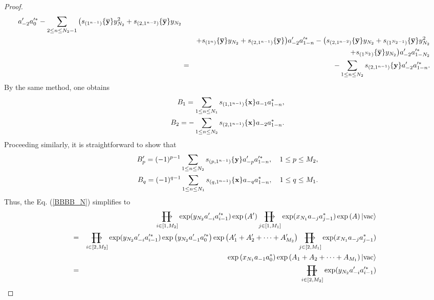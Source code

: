 \documentclass[11pt,reqno]{amsart}
\numberwithin{equation}{section}
\def\rprod{\mathop{\prod{\mkern-28.0mu}{\mathbf\longrightarrow}}}
\begin{document}
\begin{proof}
\begin{eqnarray}
a^{\prime}_{-2}a^{\prime\ast}_{0}-\sum\limits_{2\leq n\leq N_{2}-1}\big(s_{(1^{n-1})}\{\mathbf{\overline{y}}\}y^{2}_{N_{2}}
+s_{(2,1^{n-2})}\{\mathbf{\overline{y}}\}
y_{N_{2}}\notag\\
&&+s_{(1^{n})}\{\mathbf{\overline{y}}\}y_{N_{2}}+s_{(2,1^{n-1})}
\{\mathbf{\overline{y}}\}\big)a^{\prime}_{-2}a^{\prime\ast}_{1-n}-
\big(s_{(2,1^{n-2})}\{\mathbf{\overline{y}}\}
y_{N_{2}}+s_{(1^{N_{2}-1})}\{\mathbf{\overline{y}}\}y^{2}_{N_{2}}\notag\\
&&+s_{(1^{N_{2}})}\{\mathbf{\overline{y}}\}y_{N_{2}}\big)
a^{\prime}_{-2}a^{\prime\ast}_{1-N_{2}}\notag\\
&=&-\sum\limits_{1\leq n\leq N_{2}}s_{(2,1^{n-1})}\{\mathbf{y}\}a^{\prime}_{-2}a^{\prime\ast}_{1-n}.
\end{eqnarray}
By the same method, one obtains
\begin{eqnarray}
&&B_{1}=\sum\limits_{1\leq n\leq N_{1}}s_{(1,1^{n-1})}\{\mathbf{x}\}a_{-1}a^{\ast}_{1-n},\notag\\
&&B_{2}=-\sum\limits_{1\leq n\leq N_{2}}s_{(2,1^{n-1})}\{\mathbf{x}\}a_{-2}a^{\ast}_{1-n}.
\end{eqnarray}
Proceeding similarly, it is straightforward to show that
\begin{eqnarray}
&&B^{\prime}_{p}=(-1)^{p-1}\sum\limits_{1\leq n\leq N_{2}}s_{(p,1^{n-1})}\{\mathbf{y}\}a^{\prime}_{-p}a^{\prime\ast}_{1-n},\quad 1\leq p\leq M_{2},\notag\\
&&B_{q}=(-1)^{q-1}\sum\limits_{1\leq n\leq N_{1}}s_{(q,1^{n-1})}\{\mathbf{x}\}a_{-q}a^{\ast}_{1-n},\quad 1\leq q\leq M_{1}.
\end{eqnarray}
Thus, the Eq. (\ref{BBBB_N}) simplifies to
\begin{eqnarray}
&&\rprod\limits_{i\in[1,M_{2}]}\exp(y_{N_{2}}a^{\prime}_{-i}a^{\prime\ast}_{i-1})
\exp\left(A^{\prime}\right)
\rprod\limits_{j\in[1,M_{1}]}\exp(x_{N_{1}}a_{-j}a^{\ast}_{j-1})\exp\left(A\right)
|\text{vac}\rangle\notag\\
&=&\rprod\limits_{i\in[2,M_{2}]}\exp(y_{N_{2}}a^{\prime}_{-i}a^{\prime\ast}_{i-1})
\exp\left(y_{N_{2}}a^{\prime}_{-1}a^{\prime\ast}_{0}\right)\exp\left(A^{\prime}_{1}
+A^{\prime}_{2}+\cdots+A^{\prime}_{M_{2}}\right)
\rprod\limits_{j\in[2,M_{1}]}\exp(x_{N_{1}}a_{-j}a^{\ast}_{j-1})\notag\\
&&\exp\left(x_{N_{1}}a_{-1}a^{\ast}_{0}\right)\exp\left(A_{1}
+A_{2}+\cdots+A_{M_{1}}\right)|\text{vac}\rangle\notag\\
&=&\rprod\limits_{i\in[2,M_{2}]}\exp(y_{N_{2}}a^{\prime}_{-i}a^{\prime\ast}_{i-1})

\end{eqnarray}
\end{proof}
\end{document}
